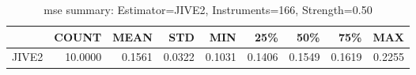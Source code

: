 \begin{table}[ht]
\centering
\caption{mse summary: Estimator=JIVE2, Instruments=166, Strength=0.50}
\begin{tabular}{lrrrrrrrr}
\toprule
 & COUNT & MEAN & STD & MIN & 25\% & 50\% & 75\% & MAX \\
\midrule
JIVE2 & 10.0000 & 0.1561 & 0.0322 & 0.1031 & 0.1406 & 0.1549 & 0.1619 & 0.2255 \\
\bottomrule
\end{tabular}
\end{table}
